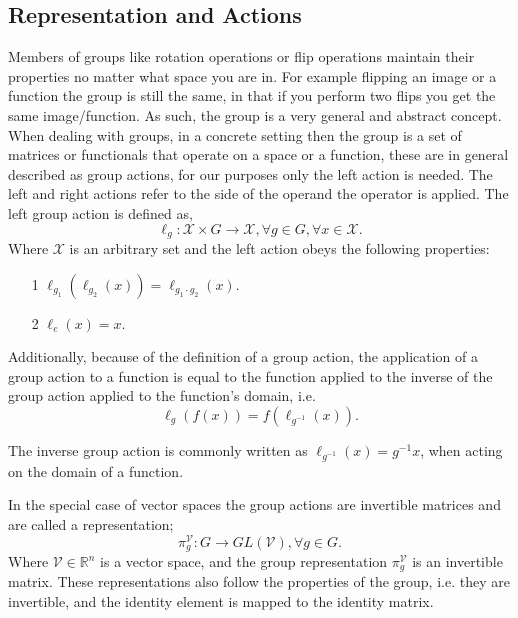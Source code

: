 \subsection{Representation and Actions}
Members of groups like rotation operations or flip operations maintain their properties no matter what space you are in. For example flipping an image or a function the group is still the same, in that if you perform two flips you get the same image/function. As such, the group is a very general and abstract concept. When dealing with groups, in a concrete setting then the group is a set of matrices or functionals that operate on a space or a function, these are in general described as group actions, for our purposes only the left action is needed. The left and right actions refer to the side of the operand the operator is applied. The left group action is defined as,
\begin{equation}
	\ell_g: \mathcal{X} \times G \rightarrow \mathcal{X}, \forall g \in G, \forall x \in \mathcal{X}.
\end{equation}
Where $\mathcal{X}$ is an arbitrary set and the left action obeys the following properties:
\begin{itemize}
	\item[1] $\ell_{g_1}(\ell_{g_2}(x)) = \ell_{g_1 \cdot g_2}(x)$.
	\item[2] $\ell_e(x) = x$.
\end{itemize}
Additionally, because of the definition of a group action, the application of a group action to a function is equal to the function applied to the inverse of the group action applied to the function's domain, i.e.
\begin{equation}
	\ell_g(f(x)) = f(\ell_{g^{-1}}(x)).
\end{equation}

The inverse group action is commonly written as $\ell_{g^{-1}}(x) = g^{-1}x$, when acting on the domain of a function.

In the special case of vector spaces the group actions are invertible matrices and are called a representation;
\begin{equation}
	\pi_g^\mathcal{V}: G \rightarrow GL(\mathcal{V}), \forall g \in G.
\end{equation}
Where $\mathcal{V} \in \mathbb{R}^n$ is a vector space, and the group representation $\pi_g^\mathcal{V}$ is an invertible matrix. These representations also follow the properties of the group, i.e. they are invertible, and the identity element is mapped to the identity matrix.
